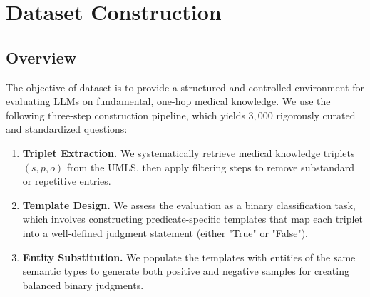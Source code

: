 
\section{Dataset Construction}
\label{sec:dataset}


\subsection{Overview}
The objective of \mkj dataset is to provide a structured and controlled environment for evaluating LLMs on fundamental, one-hop medical knowledge. We use the following three-step construction pipeline, which yields $3,000$ rigorously curated and standardized questions:

\begin{enumerate}[left=0pt,topsep=0pt,partopsep=0pt,parsep=0pt,itemsep=0pt]
    \item \textbf{Triplet Extraction.} We systematically retrieve medical knowledge triplets $(s, p, o)$ from the UMLS, then apply filtering steps to remove substandard or repetitive entries.
    \item \textbf{Template Design.} We assess the evaluation as a binary classification task, which involves constructing predicate-specific templates that map each triplet into a well-defined judgment statement (either "True" or "False").
    \item \textbf{Entity Substitution.} We populate the templates with entities of the same semantic types to generate both positive and negative samples for creating balanced binary judgments.
\end{enumerate}

    
    



